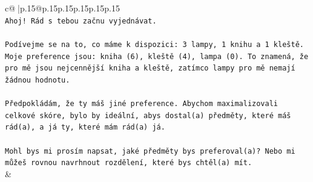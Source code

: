 \documentclass{article}
\begin{document}
{\begin{supertabular}{c@{$\;$}|p{.15\linewidth}@{}p{.15\linewidth}p{.15\linewidth}p{.15\linewidth}p{.15\linewidth}p{.15\linewidth}}
{{{\\ 
\texttt{Ahoj! Rád s tebou začnu vyjednávat.} \\
\\ 
\texttt{Podívejme se na to, co máme k dispozici: 3 lampy, 1 knihu a 1 kleště.} \\
\texttt{Moje preference jsou: kniha (6), kleště (4), lampa (0). To znamená, že pro mě jsou nejcennější kniha a kleště, zatímco lampy pro mě nemají žádnou hodnotu.} \\
\\ 
\texttt{Předpokládám, že ty máš jiné preference. Abychom maximalizovali celkové skóre, bylo by ideální, abys dostal(a) předměty, které máš rád(a), a já ty, které mám rád(a) já.} \\
\\ 
\texttt{Mohl bys mi prosím napsat, jaké předměty bys preferoval(a)? Nebo mi můžeš rovnou navrhnout rozdělení, které bys chtěl(a) mít.} \\
            }
        }
    }
    & \\ \\


\end{supertabular}}
\end{document}
